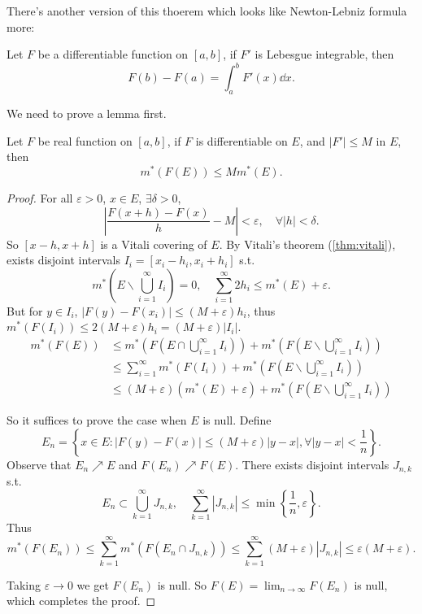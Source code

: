 There's another version of this thoerem which looks like
Newton-Lebniz formula more:
\begin{theorem}
	Let $F$ be a differentiable function on $[a,b]$,
	if $F'$ is Lebesgue integrable, then
	\[
	F(b) - F(a) = \int_{a}^{b} F'(x)\dd x.
	\]
\end{theorem}

We need to prove a lemma first.
\begin{theorem}
	Let $F$ be real function on $[a,b]$, if $F$ is differentiable on $E$,
	and $|F'|\le M$ in $E$, then
	\[
	m^*(F(E)) \le Mm^*(E).
	\]
\end{theorem}
\begin{proof}[Proof]
    For all $\varepsilon > 0$, $x\in E$, $\exists \delta > 0$,
	\[
	\left| \frac{F(x+h) - F(x)}{h} - M \right| < \varepsilon,\quad
	\forall |h| < \delta.
	\]
	So $[x-h, x+h]$ is a Vitali covering of $E$.
	By Vitali's theorem (\ref{thm:vitali}), exists disjoint
	intervals $I_i = [x_i-h_i, x_i+h_i]$ s.t.
	\[
	m^*\left(E \backslash \bigcup_{i=1}^\infty I_i\right) = 0,\quad
	\sum_{i=1}^{\infty} 2h_i \le m^*(E) + \varepsilon.
	\]
	But for $y\in I_i$, $|F(y) - F(x_i)| \le (M+\varepsilon)h_i$,
	thus $m^*(F(I_i)) \le 2(M+\varepsilon)h_i = (M+\varepsilon)|I_i|$.
	\begin{align*}
		m^*(F(E)) &\le m^*(F(E\cap \bigcup_{i=1}^\infty I_i))
		+ m^*(F(E \backslash \bigcup_{i=1}^\infty I_i))\\
		& \le \sum_{i=1}^{\infty} m^*(F(I_i))
		+ m^*(F(E \backslash \bigcup_{i=1}^\infty I_i))\\
		& \le (M+\varepsilon)(m^*(E) + \varepsilon)
		+ m^*(F(E \backslash \bigcup_{i=1}^\infty I_i))
	\end{align*}

	So it suffices to prove the case when $E$ is null.
	Define
	\[
	E_n = \left\{x\in E: |F(y) - F(x)|\le (M+\varepsilon)|y - x|,
	\forall |y - x|<\frac{1}{n}\right\}.
	\]
	Observe that $E_n \nearrow E$ and $F(E_n)\nearrow F(E)$.
	There exists disjoint intervals $J_{n,k}$ s.t.
	\[
	E_n \subset \bigcup_{k=1}^\infty J_{n,k},\quad
	\sum_{k=1}^{\infty} |J_{n,k}| \le \min\left\{\frac{1}{n}, \varepsilon\right\}.
	\]
	Thus
	\[
	m^*(F(E_n)) \le \sum_{k=1}^{\infty} m^*(F(E_n \cap J_{n,k}))
	\le \sum_{k=1}^{\infty} (M+\varepsilon) |J_{n,k}|\le \varepsilon(M+\varepsilon).
	\]

	Taking $\varepsilon \to 0$ we get $F(E_n)$ is null.
	So $F(E) = \lim_{n\to \infty} F(E_n)$ is null, which completes the proof.
\end{proof}

